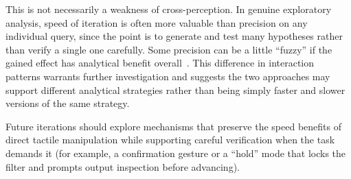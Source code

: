 \documentclass[12pt]{cmuthesis}
\begin{document}
This is not necessarily a weakness of cross-perception. In genuine exploratory analysis, speed of iteration is often more valuable than precision on any individual query, since the point is to generate and test many hypotheses rather than verify a single one carefully. Some precision can be a little ``fuzzy'' if the gained effect has analytical benefit overall~\cite{Jiang1994}. This difference in interaction patterns warrants further investigation and suggests the two approaches may support different analytical strategies rather than being simply faster and slower versions of the same strategy.

Future iterations should explore mechanisms that preserve the speed benefits of direct tactile manipulation while supporting careful verification when the task demands it (for example, a confirmation gesture or a ``hold'' mode that locks the filter and prompts output inspection before advancing). 




\end{document}
